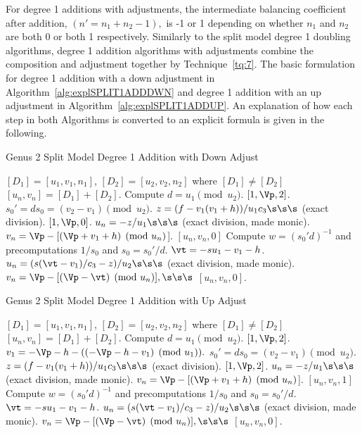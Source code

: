 For degree 1 additions with adjustments, the intermediate balancing coefficient
after addition, $(n' = n_1 + n_2 - 1),$ is -1 or 1 depending on whether $n_1$
and $n_2$ are both 0 or both 1 respectively. Similarly to the split model degree
1 doubling algorithms, degree 1 addition algorithms with adjustments combine the
composition and adjustment together by Technique~\ref{tq:7}. The basic
formulation for degree 1 addition with a down adjustment in
Algorithm~\ref{alg:explSPLIT1ADDDWN} and degree 1 addition with an up adjustment
in Algorithm~\ref{alg:explSPLIT1ADDUP}. An explanation of how each step in both
Algorithms is converted to an explicit formula is given in the following.


\begin{algorithm}[htbp]
\caption{Genus 2 Split Model Degree 1 Addition with Down Adjust\label{alg:explSPLIT1ADDDWN}}
\begin{algorithmic} [1]
\Require $[D_1] = [u_1,v_1,n_1]$, $[D_2] = [u_2,v_2,n_2]$ where $[D_1] \not = [D_2]$ \smallskip
\Ensure $[u_n,v_n] = [D_1] + [D_2] $.
\algrule
\State Compute $d = u_1 \pmod{u_2}$.
    \State \Return $[1,\Vp,2]$.
\EndIf
\State $s_0' = ds_0 = (v_2 - v_1) \pmod{u_2}$.
\State $z = (f - v_1(v_1 +h))/u_1c_3 \s\s\s$ (exact division).
        \State \Return $[1,\Vp,0]$.
    \EndIf
    \State $u_n = -z/u_1 \s\s\s$ (exact division, made monic).
    \State $v_n = \Vp - [(\Vp + v_1 + h) \pmod{u_n}$].
    \State \Return $[u_n,v_n,0]$
\EndIf
\State Compute $w = (s_0'd)^{-1}$ and precomputations $1/s_0$ and $s_0 = s_0'/d$.
\State $\vt = -su_1 - v_1 - h$.
\State $u_n = (s(\vt - v_1)/c_3 - z)/u_2 \s\s\s$ (exact division, made monic).
\State $v_n = \Vp - [(\Vp - \vt) \pmod{u_n}], \s\s\s$
\State \Return $[u_n,v_n,0]$.
\end{algorithmic}
\end{algorithm}

\begin{algorithm}[htbp]
\caption{Genus 2 Split Model Degree 1 Addition with Up Adjust\label{alg:explSPLIT1ADDUP}}
\begin{algorithmic} [1]
\Require $[D_1] = [u_1,v_1,n_1]$, $[D_2] = [u_2,v_2,n_2]$ where $[D_1] \not = [D_2]$ \smallskip
\Ensure $[u_n,v_n] = [D_1] + [D_2] $.
\algrule
\State Compute $d = u_1 \pmod{u_2}$.
    \State \Return $[1,\Vp,2]$.
\EndIf
\State $v_1 = -\Vp - h - ((-\Vp - h - v_1) \pmod{u_1}).$
\State $s_0' = ds_0 = (v_2 - v_1) \pmod{u_2}$.
\State $z = (f - v_1(v_1 +h))/u_1c_3 \s\s\s$ (exact division).
        \State \Return $[1,\Vp,2]$.
    \EndIf
    \State $u_n = -z/u_1 \s\s\s$ (exact division, made monic).
    \State $v_n = \Vp - [(\Vp + v_1 + h) \pmod{u_n}$].
    \State \Return $[u_n,v_n,1]$
\EndIf
\State Compute $w = (s_0'd)^{-1}$ and precomputations $1/s_0$ and $s_0 = s_0'/d$.
\State $\vt = -su_1 - v_1 - h$.
\State $u_n = (s(\vt - v_1)/c_3 - z)/u_2 \s\s\s$ (exact division, made monic).
\State $v_n = \Vp - [(\Vp - \vt) \pmod{u_n}], \s\s\s$
\State \Return $[u_n,v_n,0]$.
\end{algorithmic}
\end{algorithm}

